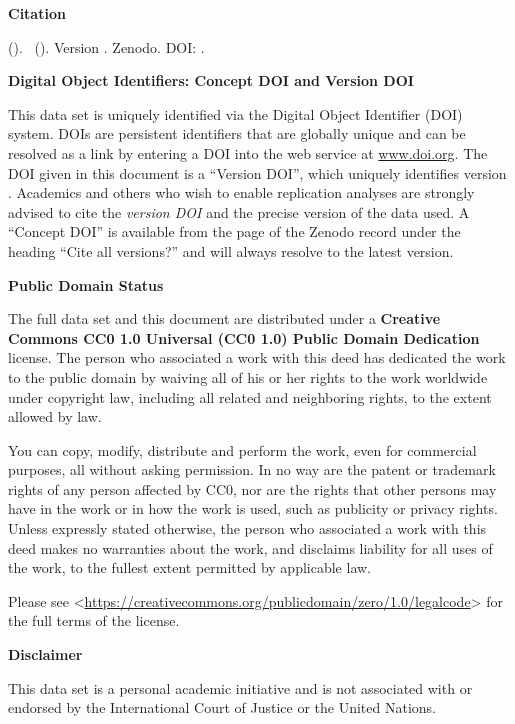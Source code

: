 \textbf{Citation}

\emph{\dataauthor} (\the\year ). \datatitle\ (\datashort ). Version \version . Zenodo. DOI: \dataversiondoi .

\vspace{0.5cm}

\textbf{Digital Object Identifiers: Concept DOI and Version DOI}

This data set is uniquely identified via the Digital Object Identifier (DOI) system. DOIs are persistent identifiers that are globally unique and can be resolved as a link by entering a DOI into the web service at \url{www.doi.org}. The DOI given in this document is a \enquote{Version DOI}, which uniquely identifies version \version. Academics and others who wish to enable replication analyses are strongly advised to cite the \emph{version DOI} and the precise version of the data used. A \enquote{Concept DOI} is available from the page of the Zenodo record under the heading \enquote{Cite all versions?} and will always resolve to the latest version.

\vspace{0.5cm}



\textbf{Public Domain Status}

The full data set and this document are distributed under a \textbf{Creative Commons CC0 1.0 Universal (CC0 1.0) Public Domain Dedication} license. The person who associated a work with this deed has dedicated the work to the public domain by waiving all of his or her rights to the work worldwide under copyright law, including all related and neighboring rights, to the extent allowed by law.

You can copy, modify, distribute and perform the work, even for commercial purposes, all without asking permission. In no way are the patent or trademark rights of any person affected by CC0, nor are the rights that other persons may have in the work or in how the work is used, such as publicity or privacy rights. Unless expressly stated otherwise, the person who associated a work with this deed makes no warranties about the work, and disclaims liability for all uses of the work, to the fullest extent permitted by applicable law. 

Please see <\url{https://creativecommons.org/publicdomain/zero/1.0/legalcode}> for the full terms of the license.


\vspace{0.5cm}

\textbf{Disclaimer} 

This data set is a personal academic initiative and is not associated with or endorsed by the International Court of Justice or the United Nations.


\newpage